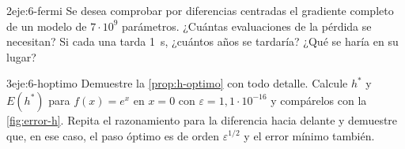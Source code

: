 \begin{ejercicio}{2}{eje:6-fermi}
Se desea comprobar por diferencias centradas el gradiente completo de un modelo de $7\cdot 10^{9}$ parámetros. ¿Cuántas evaluaciones de la pérdida se necesitan? Si cada una tarda 1~s, ¿cuántos años se tardaría? ¿Qué se haría en su lugar?
\end{ejercicio}

\begin{ejercicio}{3}{eje:6-hoptimo}
Demuestre la \cref{prop:h-optimo} con todo detalle. Calcule $h^{*}$ y $E(h^{*})$ para $f(x)=e^{x}$ en $x=0$ con $\varepsilon=1{,}1\cdot 10^{-16}$ y compárelos con la \cref{fig:error-h}. Repita el razonamiento para la diferencia hacia delante y demuestre que, en ese caso, el paso óptimo es de orden $\varepsilon^{1/2}$ y el error mínimo también.
\end{ejercicio}
